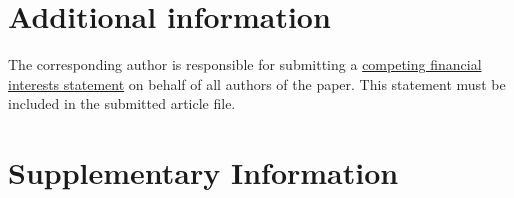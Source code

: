 \documentclass[fleqn,10pt]{wlscirep}
\begin{document}
\section*{Additional information}

The corresponding author is responsible for submitting a \href{http://www.nature.com/srep/policies/index.html#competing}{competing financial interests statement} on behalf of all authors of the paper. This statement must be included in the submitted article file.

\section*{Supplementary Information}
\end{document}
